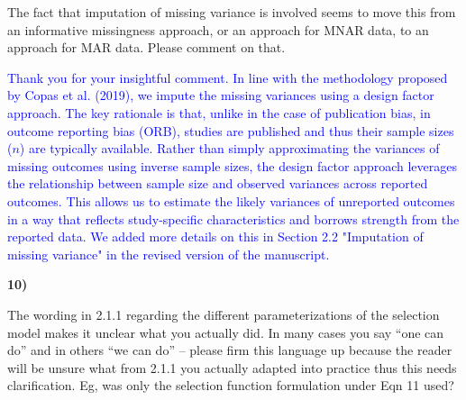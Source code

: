 \documentclass{article}
\begin{document}
\bigskip

The fact that imputation of missing variance is involved seems to move this from an informative missingness approach, or an approach for MNAR data, to an approach for MAR data. Please comment on that. 

\bigskip

\textcolor{blue}{Thank you for your insightful comment. In line with the methodology proposed by Copas et al. (2019), we impute the missing variances using a design factor approach. The key rationale is that, unlike in the case of publication bias, in outcome reporting bias (ORB), studies are published and thus their sample sizes ($n$) are typically available. Rather than simply approximating the variances of missing outcomes using inverse sample sizes, the design factor approach leverages the relationship between sample size and observed variances across reported outcomes. This allows us to estimate the likely variances of unreported outcomes in a way that reflects study-specific characteristics and borrows strength from the reported data. We added more details on this in Section 2.2 "Imputation of missing variance" in the revised version of the manuscript.}

\bigskip



\textbf{10)}

\bigskip

The wording in 2.1.1 regarding the different parameterizations of the selection model makes it unclear what you actually did. In many cases you say “one can do” and in others “we can do” – please firm this language up because the reader will be unsure what from 2.1.1 you actually adapted into practice thus this needs clarification. Eg, was only the selection function formulation under Eqn 11 used? 
\end{document}
